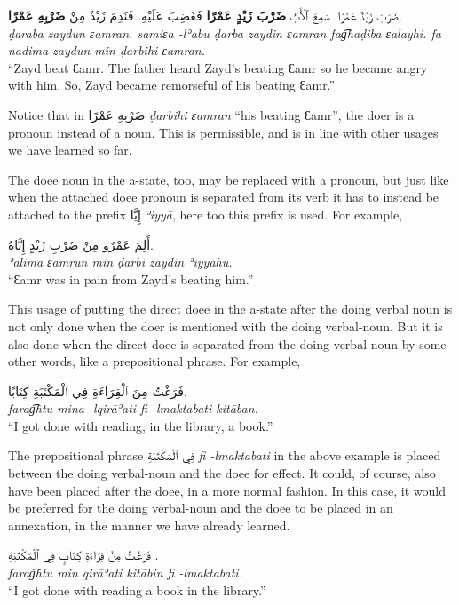 \documentclass[
  10pt,
]{book}
\begin{document}
\foreignlanguage{arabic}{ضَرَبَ زَيْدٌ عَمْرًا. سَمِعَ ٱلْأَبُ \textbf{ضَرْبَ زَيْدٍ عَمْرًا} فَغَضِبَ عَلَيْهِ. فَنَدِمَ زَيْدٌ مِنْ \textbf{ضَرْبِهِ عَمْرًا}.}\\
\emph{ḍaraba zaydun ɛamran. samiɛa -lʾabu ḍarba zaydin ɛamran fag͡haḍiba ɛalayhi. fa nadima zaydun min ḍarbihi ɛamran.}\\
\enquote{Zayd beat Ɛamr. The father heard Zayd's beating Ɛamr so he became angry with him. So, Zayd became remorseful of his beating Ɛamr.}

Notice that in \foreignlanguage{arabic}{ضَرْبِهِ عَمْرًا} \emph{ḍarbihi ɛamran} \enquote{his beating Ɛamr}, the doer is a pronoun instead of a noun. This is permissible, and is in line with other usages we have learned so far.

The doee noun in the a-state, too, may be replaced with a pronoun, but just like when the attached doee pronoun is separated from its verb it has to instead be attached to the prefix \foreignlanguage{arabic}{إِيَّا} \emph{ʾiyyā}, here too this prefix is used. For example,

\foreignlanguage{arabic}{أَلِمَ عَمْرٌو مِنْ ضَرْبِ زَيْدٍ إِيَّاهُ.}\\
\emph{ʾalima ɛamrun min ḍarbi zaydin ʾiyyāhu.}\\
\enquote{Ɛamr was in pain from Zayd's beating him.}

This usage of putting the direct doee in the a-state after the doing verbal noun is not only done when the doer is mentioned with the doing verbal-noun. But it is also done when the direct doee is separated from the doing verbal-noun by some other words, like a prepositional phrase. For example,

\foreignlanguage{arabic}{فَرَغْتُ مِنَ ٱلْقِرَاءَةِ فِي ٱلْمَکْتَبَةِ کِتَابًا.}\\
\emph{farag͡htu mina -lqirāʾati fi -lmaktabati kitāban.}\\
\enquote{I got done with reading, in the library, a book.}

The prepositional phrase \foreignlanguage{arabic}{فِي ٱلْمَکْتَبَةِ} \emph{fi -lmaktabati} in the above example is placed between the doing verbal-noun and the doee for effect. It could, of course, also have been placed after the doee, in a more normal fashion. In this case, it would be preferred for the doing verbal-noun and the doee to be placed in an annexation, in the manner we have already learned.

\foreignlanguage{arabic}{فَرَغْتُ مِنْ قِرَاءَةِ کِتَابٍ فِي ٱلْمَکْتَبَةِ .}\\
\emph{farag͡htu min qirāʾati kitābin fi -lmaktabati.}\\
\enquote{I got done with reading a book in the library.}
\end{document}
